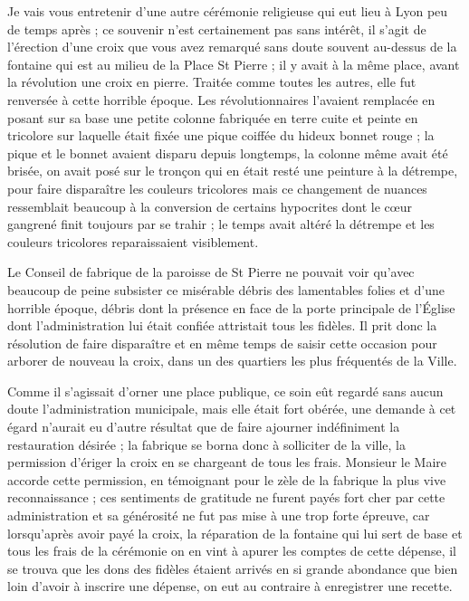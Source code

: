 \documentclass[11pt,a4paper]{report}
\begin{document}
Je vais vous entretenir d'une autre cérémonie religieuse qui eut lieu à Lyon peu de temps après ; ce souvenir n'est certainement pas sans intérêt, il s'agit de l'érection d'une croix que vous avez remarqué sans doute souvent au-dessus de la fontaine qui est au milieu de la Place St Pierre ; il y avait à la même place, avant la révolution une croix en pierre. Traitée comme toutes les autres, elle fut renversée à cette horrible époque. Les révolutionnaires l'avaient remplacée en posant sur sa base une petite colonne fabriquée en terre cuite et peinte en tricolore sur laquelle était fixée une pique coiffée du hideux bonnet rouge ; la pique et le bonnet avaient disparu depuis longtemps, la colonne même avait été brisée, on avait posé sur le tronçon qui en était resté une peinture à la détrempe, pour faire disparaître les couleurs tricolores mais ce changement de nuances ressemblait beaucoup à la conversion de certains hypocrites dont le cœur gangrené finit toujours par se trahir ; le temps avait altéré la détrempe et les couleurs tricolores reparaissaient visiblement.

Le Conseil de fabrique de la paroisse de St Pierre ne pouvait voir qu'avec beaucoup de peine subsister ce misérable débris des lamentables folies et d'une horrible époque, débris dont la présence en face de la porte principale de l'Église dont l'administration lui était confiée attristait tous les fidèles. Il prit donc la résolution de faire disparaître et en même temps de saisir cette occasion pour arborer de nouveau la croix, dans un des quartiers les plus fréquentés de la Ville.

Comme il s'agissait d'orner une place publique, ce soin eût regardé sans aucun doute l'administration municipale, mais elle était fort obérée, une demande à cet égard n'aurait eu d'autre résultat que de faire ajourner indéfiniment la restauration désirée ; la fabrique se borna donc à solliciter de la ville, la permission d'ériger la croix en se chargeant de tous les frais. Monsieur le Maire accorde cette permission, en témoignant pour le zèle de la fabrique la plus vive reconnaissance ; ces sentiments de gratitude ne furent payés fort cher par cette administration et sa générosité ne fut pas mise à une trop forte épreuve, car lorsqu'après avoir payé la croix, la réparation de la fontaine qui lui sert de base et tous les frais de la cérémonie on en vint à apurer les comptes de cette dépense, il se trouva que les dons des fidèles étaient arrivés en si grande abondance que bien loin d'avoir à inscrire une dépense, on eut au contraire à enregistrer une recette.
\end{document}
